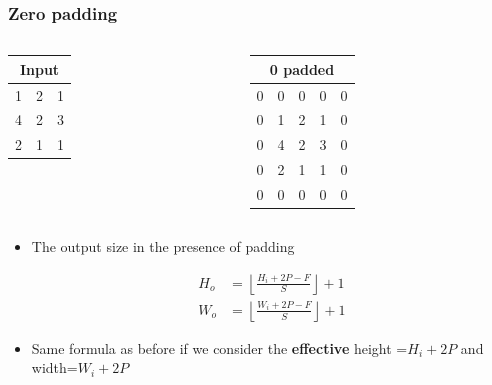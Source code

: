\documentclass{beamer}
\begin{document}
\begin{frame}
    \frametitle{Zero padding}
\begin{columns}
\begin{column}{0.5\textwidth}
    \begin{tabular}[h]{|c|c|c|}
        \multicolumn{3}{c}{Input}\\
        \hline
         1& 2 &1 \\
         \hline
         4 & 2 & 3 \\
         \hline
         2 & 1 & 1\\
        \hline
    \end{tabular}

    
\end{column}
\begin{column}{0.5\textwidth}
    \begin{tabular}[h]{|c|c|c|c|c|}
        \multicolumn{5}{c}{0 padded}\\
        \hline
        {\color{red}0} & {\color{red}0} & {\color{red}0} & {\color{red}0} &{\color{red}0}\\
        \hline
        {\color{red}0} & 1& 2 &1 & {\color{red}0}\\
         \hline
         {\color{red}0}&  4 & 2 & 3 & {\color{red}0} \\
         \hline
         {\color{red}0}& 2 & 1 & 1 & {\color{red}0}\\
        \hline
        {\color{red}0} & {\color{red}0} & {\color{red}0} & {\color{red}0} & {\color{red}0}\\
        \hline
    \end{tabular}
\end{column}

\end{columns}
    \begin{itemize}
        \item The output size in the presence of padding
   
    \begin{align*}
        H_o&=\left\lfloor\frac{H_i+2P-F}{S}\right\rfloor+1\\
        W_o&=\left\lfloor\frac{W_i+2P-F}{S}\right\rfloor+1
    \end{align*}
    \item  Same formula as before if we consider the \textbf{effective} height =$H_i+2P$ and width=$W_i+2P$ 
\end{itemize}
\end{frame}
\end{document}

